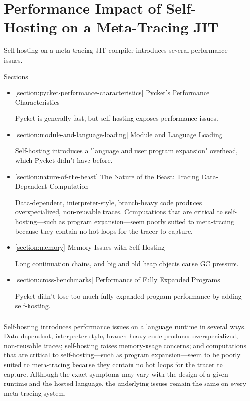 \chapter{Performance Impact of Self-Hosting on a Meta-Tracing JIT}

	\label{chapter:problem}

	\begin{chaptersynopsis}
		Self-hosting on a meta-tracing JIT compiler introduces several performance issues.

		Sections:
		\begin{itemize}
			\item \ref{section:pycket-performance-characteristics} Pycket's Performance Characteristics

				Pycket is generally fast, but self-hosting exposes performance issues.
			\item \ref{section:module-and-language-loading} Module and Language Loading

				Self-hosting introduces a "language and user program expansion" overhead, which Pycket didn't have before.
			\item \ref{section:nature-of-the-beast} The Nature of the Beast: Tracing Data-Dependent Computation

				Data-dependent, interpreter-style, branch-heavy code produces overspecialized, non-reusable traces. Computations that are critical to self-hosting—such as program expansion—seem poorly suited to meta-tracing because they contain no hot loops for the tracer to capture.
			\item \ref{section:memory} Memory Issues with Self-Hosting

				Long continuation chains, and big and old heap objects cause GC pressure.
			\item \ref{section:cross-benchmarks} Performance of Fully Expanded Programs

				Pycket didn't lose too much fully-expanded-program performance by adding self-hosting.
		\end{itemize}
	\end{chaptersynopsis}

	\paragraph{}%
	 	Self-hosting introduces performance issues on a language runtime in several ways. Data-dependent, interpreter-style, branch-heavy code produces overspecialized, non-reusable traces; self-hosting raises memory-usage concerns; and computations that are critical to self-hosting—such as program expansion—seem to be poorly suited to meta-tracing because they contain no hot loops for the tracer to capture. Although the exact symptoms may vary with the design of a given runtime and the hosted language, the underlying issues remain the same on every meta-tracing system.

